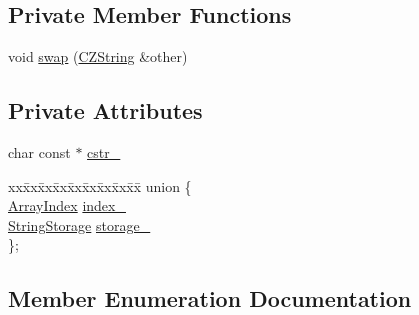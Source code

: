\subsection*{Private Member Functions}
\begin{DoxyCompactItemize}
\item 
void \hyperlink{classJson_1_1Value_1_1CZString_ad59f3542d2eea749a6a63409d1a02207}{swap} (\hyperlink{classJson_1_1Value_1_1CZString}{C\+Z\+String} \&other)
\end{DoxyCompactItemize}
\subsection*{Private Attributes}
\begin{DoxyCompactItemize}
\item 
char const $\ast$ \hyperlink{classJson_1_1Value_1_1CZString_a5b4d28349294034d7f779c3c95d0306c}{cstr\+\_\+}
\item 
\begin{tabbing}
xx\=xx\=xx\=xx\=xx\=xx\=xx\=xx\=xx\=\kill
union \{\\
\>\hyperlink{classJson_1_1Value_a184a91566cccca7b819240f0d5561c7d}{ArrayIndex} \hyperlink{classJson_1_1Value_1_1CZString_aecf29982235c9c165a0971023ebbb270}{index\_}\\
\>\hyperlink{structJson_1_1Value_1_1CZString_1_1StringStorage}{StringStorage} \hyperlink{classJson_1_1Value_1_1CZString_a17c92f0f089a4314e3b1d5695dc1a851}{storage\_}\\
\}; \\

\end{tabbing}\end{DoxyCompactItemize}


\subsection{Member Enumeration Documentation}
